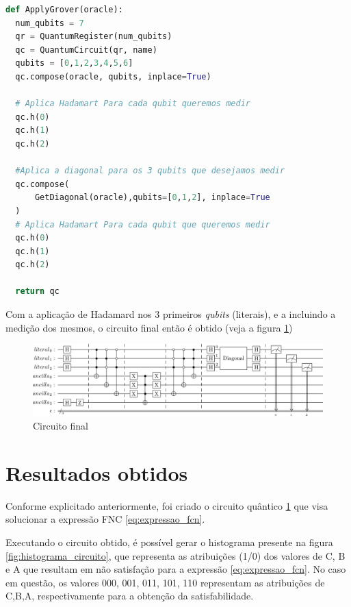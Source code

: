 \documentclass[12pt]{article}
\begin{document}
\begin{lstlisting}[language=Python, caption={Adição do operador de Grover ao \textit{oráculo}}, frame=single, label={lst:create_difusor}]
def ApplyGrover(oracle):
  num_qubits = 7
  qr = QuantumRegister(num_qubits)
  qc = QuantumCircuit(qr, name)
  qubits = [0,1,2,3,4,5,6]
  qc.compose(oracle, qubits, inplace=True)

  # Aplica Hadamart Para cada qubit queremos medir
  qc.h(0)
  qc.h(1)
  qc.h(2)

  #Aplica a diagonal para os 3 qubits que desejamos medir
  qc.compose(
      GetDiagonal(oracle),qubits=[0,1,2], inplace=True
  )
  # Aplica Hadamart Para cada qubit que queremos medir
  qc.h(0)
  qc.h(1)
  qc.h(2)

  return qc
\end{lstlisting}

Com a aplicação de Hadamard nos 3 primeiros \textit{qubits} (literais), e a incluindo a medição dos mesmos, o circuito final então é obtido (veja a figura \ref{fig:circuito_final})

\begin{figure}[ht]
    \centering
    \includegraphics[width=1\linewidth]{circuito_final.png}
    \caption{Circuito final}
    \label{fig:circuito_final}
\end{figure}

\section{Resultados obtidos}

Conforme explicitado anteriormente, foi criado o circuito quântico \ref{fig:circuito_final} que visa solucionar a expressão FNC \ref{eq:expressao_fcn}.

Executando o circuito obtido, é possível gerar o histograma presente na figura \ref{fig:histograma_circuito}, que representa as atribuições (1/0) dos valores de C, B e A que resultam em não satisfação para a expressão \ref{eq:expressao_fcn}.
No caso em questão, os valores 000, 001, 011, 101, 110 representam as atribuições de C,B,A, respectivamente para a obtenção da satisfabilidade.
\end{document}
